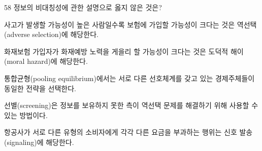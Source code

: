 \begin{question}{58}
정보의 비대칭성에 관한 설명으로 옳지 않은 것은?
\begin{choices}
  \item 사고가 발생할 가능성이 높은 사람일수록 보험에 가입할 가능성이 크다는 것은 역선택(adverse selection)에 해당한다.
  \item 화재보험 가입자가 화재예방 노력을 게을리 할 가능성이 크다는 것은 도덕적 해이(moral hazard)에 해당한다.
  \item 통합균형(pooling equilibrium)에서는 서로 다른 선호체계를 갖고 있는 경제주체들이 동일한 전략을 선택한다.
  \item 선별(screening)은 정보를 보유하지 못한 측이 역선택 문제를 해결하기 위해 사용할 수 있는 방법이다.
  \item 항공사가 서로 다른 유형의 소비자에게 각각 다른 요금을 부과하는 행위는 신호 발송(signaling)에 해당한다.
\end{choices}
\end{question}
